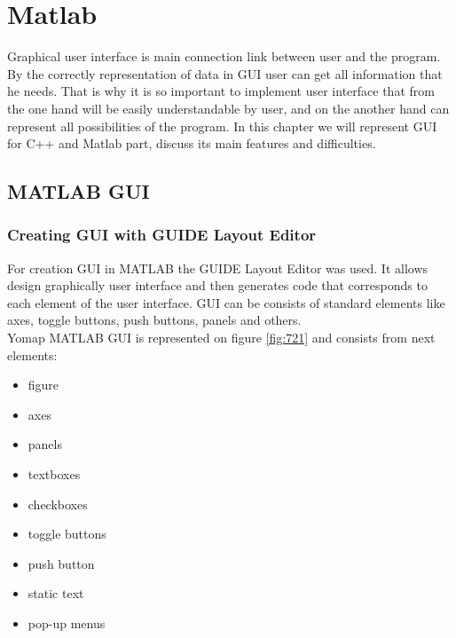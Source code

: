 \section{Matlab}
	Graphical user interface is main connection link between user and the program. By the correctly representation of data in GUI user can get all information that he needs. That is why it is so important to implement user interface that from the one hand will be easily understandable by user, and on the another hand can represent all possibilities of the program. In this chapter we will represent GUI for C++ and Matlab part, discuss its main features and difficulties.
	
	\subsection{MATLAB GUI}
	
		\subsubsection{Creating GUI with GUIDE Layout Editor}
			For creation GUI in MATLAB the GUIDE Layout Editor was used. It allows design graphically user interface and then generates code that corresponds to each element of the user interface. GUI can be consists of standard elements like axes, toggle buttons, push buttons, panels and others.\\
			
			Yomap MATLAB GUI is represented on figure \ref{fig:721} and consists from next elements:
			\begin{itemize}
				\item figure
				\item axes
				\item panels
				\item textboxes
				\item checkboxes
				\item toggle buttons
				\item push button
				\item static text
				\item pop-up menus
			\end{itemize}
			
